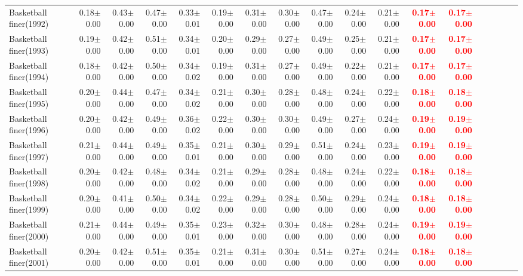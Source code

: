 \documentclass[nohyperref]{article}
\theoremstyle{plain}
\theoremstyle{definition}
\theoremstyle{remark}
\newcommand{\red}[1]{\textcolor{red}{\textbf{#1}}}
\begin{document}
\begin{table*}[!ht]
{\begin{tabular}{lrrrrrrrrrrrrrrrrr}
			Basketball finer(1992) & 0.18$\pm$0.00 & 0.43$\pm$0.00 & 0.47$\pm$0.00 & 0.33$\pm$0.01 & 0.19$\pm$0.00 & 0.31$\pm$0.00 & 0.30$\pm$0.00 & 0.47$\pm$0.00 & 0.24$\pm$0.00 & 0.21$\pm$0.00 & \red{0.17$\pm$0.00} & \red{0.17$\pm$0.00} \\
			Basketball finer(1993) & 0.19$\pm$0.00 & 0.42$\pm$0.00 & 0.51$\pm$0.00 & 0.34$\pm$0.01 & 0.20$\pm$0.00 & 0.29$\pm$0.00 & 0.27$\pm$0.00 & 0.49$\pm$0.00 & 0.25$\pm$0.00 & 0.21$\pm$0.00 & \red{0.17$\pm$0.00} & \red{0.17$\pm$0.00} \\
			Basketball finer(1994) & 0.18$\pm$0.00 & 0.42$\pm$0.00 & 0.50$\pm$0.00 & 0.34$\pm$0.02 & 0.19$\pm$0.00 & 0.31$\pm$0.00 & 0.27$\pm$0.00 & 0.49$\pm$0.00 & 0.22$\pm$0.00 & 0.21$\pm$0.00 & \red{0.17$\pm$0.00} & \red{0.17$\pm$0.00} \\
			Basketball finer(1995) & 0.20$\pm$0.00 & 0.44$\pm$0.00 & 0.47$\pm$0.00 & 0.34$\pm$0.02 & 0.21$\pm$0.00 & 0.30$\pm$0.00 & 0.28$\pm$0.00 & 0.48$\pm$0.00 & 0.24$\pm$0.00 & 0.22$\pm$0.00 & \red{0.18$\pm$0.00} & \red{0.18$\pm$0.00} \\
			Basketball finer(1996) & 0.20$\pm$0.00 & 0.42$\pm$0.00 & 0.49$\pm$0.00 & 0.36$\pm$0.02 & 0.22$\pm$0.00 & 0.30$\pm$0.00 & 0.30$\pm$0.00 & 0.49$\pm$0.00 & 0.27$\pm$0.00 & 0.24$\pm$0.00 & \red{0.19$\pm$0.00} & \red{0.19$\pm$0.00} \\
			Basketball finer(1997) & 0.21$\pm$0.00 & 0.44$\pm$0.00 & 0.49$\pm$0.00 & 0.35$\pm$0.01 & 0.21$\pm$0.00 & 0.30$\pm$0.00 & 0.29$\pm$0.00 & 0.51$\pm$0.00 & 0.24$\pm$0.00 & 0.23$\pm$0.00 & \red{0.19$\pm$0.00} & \red{0.19$\pm$0.00} \\
			Basketball finer(1998) & 0.20$\pm$0.00 & 0.42$\pm$0.00 & 0.48$\pm$0.00 & 0.34$\pm$0.02 & 0.21$\pm$0.00 & 0.29$\pm$0.00 & 0.28$\pm$0.00 & 0.48$\pm$0.00 & 0.24$\pm$0.00 & 0.22$\pm$0.00 & \red{0.18$\pm$0.00} & \red{0.18$\pm$0.00} \\
			Basketball finer(1999) & 0.20$\pm$0.00 & 0.41$\pm$0.00 & 0.50$\pm$0.00 & 0.34$\pm$0.02 & 0.22$\pm$0.00 & 0.29$\pm$0.00 & 0.28$\pm$0.00 & 0.50$\pm$0.00 & 0.29$\pm$0.00 & 0.24$\pm$0.00 & \red{0.18$\pm$0.00} & \red{0.18$\pm$0.00} \\
			Basketball finer(2000) & 0.21$\pm$0.00 & 0.44$\pm$0.00 & 0.49$\pm$0.00 & 0.35$\pm$0.01 & 0.23$\pm$0.00 & 0.32$\pm$0.00 & 0.30$\pm$0.00 & 0.48$\pm$0.00 & 0.28$\pm$0.00 & 0.24$\pm$0.00 & \red{0.19$\pm$0.00} & \red{0.19$\pm$0.00} \\
			Basketball finer(2001) & 0.20$\pm$0.00 & 0.42$\pm$0.00 & 0.51$\pm$0.00 & 0.35$\pm$0.01 & 0.21$\pm$0.00 & 0.31$\pm$0.00 & 0.30$\pm$0.00 & 0.51$\pm$0.00 & 0.27$\pm$0.00 & 0.24$\pm$0.00 & \red{0.18$\pm$0.00} & \red{0.18$\pm$0.00} \\

\end{tabular}}
\end{table*}
\end{document}
